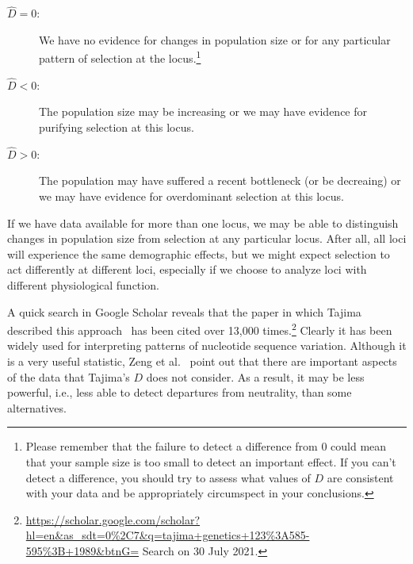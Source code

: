 \begin{description}

\item[$\hat D = 0$:] We have no evidence for changes in population
  size or for any particular pattern of selection at the
  locus.\footnote{Please remember that the failure to detect a difference
    from 0 could mean that your sample size is too small to detect an
    important effect. If you can't detect a difference, you should try
    to assess what values of $D$ are consistent with your data and be
    appropriately circumspect in your conclusions.}

\item[$\hat D < 0$:] The population size may be increasing or we may
  have evidence for purifying selection at this locus.

\item[$\hat D > 0$:] The population may have suffered a recent
  bottleneck (or be decreaing) or we may have evidence for
  overdominant selection at this locus.

\end{description}

\noindent If we have data available for more than one locus, we may be
able to distinguish changes in population size from selection at any
particular locus. After all, all loci will experience the same
demographic effects, but we might expect selection to act differently
at different loci, especially if we choose to analyze loci with
different physiological function.

A quick search in Google Scholar reveals that the paper in which
Tajima described this approach~\cite{Tajima89} has been cited over
13,000
times.\footnote{\url{https://scholar.google.com/scholar?hl=en&as_sdt=0\%2C7&q=tajima+genetics+123\%3A585-595\%3B+1989&btnG=}
  Search on 30 July 2021.} Clearly it has been widely used for
interpreting patterns of nucleotide sequence variation. Although it is
a very useful statistic, Zeng et al.~\cite{Zeng-etal-2006} point out
that there are important aspects of the data that Tajima's $D$ does
not consider. As a result, it may be less powerful, i.e., less able to
detect departures from neutrality, than some alternatives.

